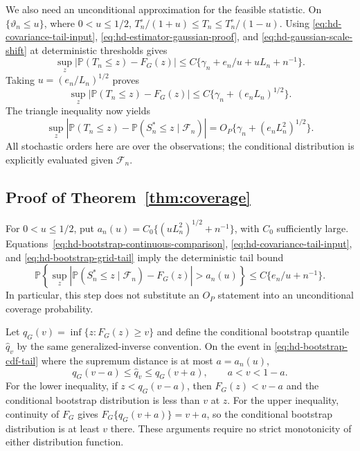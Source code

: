 \documentclass[12pt]{article}
\newcommand{\prob}{\mathbb{P}}
\numberwithin{equation}{section}
\begin{document}
We also need an unconditional approximation for the feasible statistic.
On $\{\vartheta_n\le u\}$, where $0<u\le1/2$,
$T_n^\circ/(1+u)\le T_n\le T_n^\circ/(1-u)$.
Using \eqref{eq:hd-covariance-tail-input},
\eqref{eq:hd-estimator-gaussian-proof}, and
\eqref{eq:hd-gaussian-scale-shift} at deterministic thresholds gives
\[
 \sup_z|\prob(T_n\le z)-F_G(z)|
 \le C\{\gamma_n+e_n/u+uL_n+n^{-1}\}.
\]
Taking $u=(e_n/L_n)^{1/2}$ proves
\begin{equation}
 \sup_z|\prob(T_n\le z)-F_G(z)|
 \le C\{\gamma_n+(e_nL_n)^{1/2}\}.
 \label{eq:hd-feasible-gaussian-proof}
\end{equation}
The triangle inequality now yields
\[
 \sup_z|\prob(T_n\le z)-\prob(S_n^*\le z\mid\mathcal F_n)|
 =O_P\{\gamma_n+(e_nL_n^2)^{1/2}\}.
\]
All stochastic orders here are over the observations; the conditional
distribution is explicitly evaluated given $\mathcal F_n$.

\subsection{Proof of Theorem~\ref{thm:coverage}}

For $0<u\le1/2$, put
$a_n(u)=C_0\{(uL_n^2)^{1/2}+n^{-1}\}$, with $C_0$ sufficiently large.
Equations~\eqref{eq:hd-bootstrap-continuous-comparison},
\eqref{eq:hd-covariance-tail-input}, and
\eqref{eq:hd-bootstrap-grid-tail} imply the deterministic tail bound
\begin{equation}
 \prob\!\left\{\sup_z|\prob(S_n^*\le z\mid\mathcal F_n)-F_G(z)|
                   >a_n(u)\right\}
 \le C\{e_n/u+n^{-1}\}.
 \label{eq:hd-bootstrap-cdf-tail}
\end{equation}
In particular, this step does not substitute an $O_P$ statement into an
unconditional coverage probability.

Let $q_G(v)=\inf\{z:F_G(z)\ge v\}$ and define the conditional bootstrap
quantile $\widehat q_v$ by the same generalized-inverse convention.
On the event in \eqref{eq:hd-bootstrap-cdf-tail} where the supremum
distance is at most $a=a_n(u)$,
\begin{equation}
 q_G(v-a)\le\widehat q_v\le q_G(v+a),\qquad a<v<1-a.
 \label{eq:hd-quantile-bracket}
\end{equation}
For the lower inequality, if $z<q_G(v-a)$, then
$F_G(z)<v-a$ and the conditional bootstrap distribution is less than
$v$ at $z$. For the upper inequality, continuity of $F_G$ gives
$F_G\{q_G(v+a)\}=v+a$, so the conditional bootstrap distribution
is at least $v$ there. These arguments require no strict monotonicity
of either distribution function.
\end{document}
